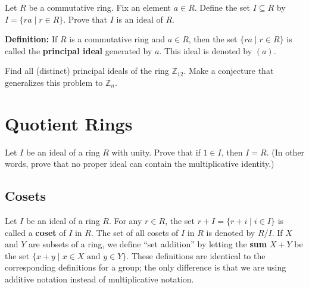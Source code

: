 \begin{problem}
Let \(R\) be a commutative ring. Fix an element \(a \in R\). Define the set \(I \subseteq R\) by \(I = \{ ra \mid r\in R\}\). Prove that \(I\) is an ideal of \(R\).
\end{problem}

\textbf{Definition:} If \(R\) is a commutative ring and \(a\in R\), then the set \(\{ra \mid r\in R\}\) is called the \textbf{principal ideal} generated by \(a\). This ideal is denoted by \((a)\).

\begin{problem}
Find all (distinct) principal ideals of the ring \(\mathbb{Z}_{12}\). Make a conjecture that generalizes this problem to \(\mathbb{Z}_n\).
\end{problem}

\chapter{Quotient Rings}

\begin{problem}
Let \(I\) be an ideal of a ring \(R\) with unity. Prove that if \(1\in I\), then \(I=R\). (In other words, prove that no proper ideal can contain the multiplicative identity.)
\end{problem}

\section{Cosets}

Let \(I\) be an ideal of a ring \(R\). For any \(r\in R\), the set \(r+I = \{r+i \mid i \in I\}\) is called a \textbf{coset} of \(I\) in \(R\). The set of all cosets of \(I\) in \(R\) is denoted by \(R/I\). If \(X\) and \(Y\) are subsets of a ring, we define ``set addition'' by letting the \textbf{sum} \(X+Y\) be the set \(\{x+y \mid x\in X \mbox{ and } y\in Y\}\).
These definitions are identical to the corresponding definitions for a group; the only difference is that we are using additive notation instead of multiplicative notation.

